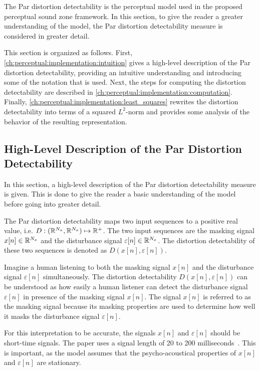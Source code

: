 The Par distortion detectability is the perceptual model used in the proposed perceptual sound zone framework.
In this section, to give the reader a greater understanding of the model, the Par distortion detectability measure is considered in greater detail.

This section is organized as follows.
First, \autoref{ch:perceptual:implementation:intuition} gives a high-level description of the Par distortion detectability, providing an intuitive understanding and introducing some of the notation that is used.
Next, the steps for computing the distortion detectability are described in 
\autoref{ch:perceptual:implementation:computation}.
Finally, \autoref{ch:perceptual:implementation:least_squares} rewrites the distortion detectability into terms of a squared $L^2$-norm and provides some analysis of the behavior of the resulting representation.

\subsection{High-Level Description of the Par Distortion Detectability}
\label{ch:perceptual:implementation:intuition}
In this section, a high-level description of the Par distortion detectability measure is given.
This is done to give the reader a basic understanding of the model before going into greater detail.

The Par distortion detectability maps two input sequences to a positive real value, i.e. $D: (\mathbb{R}^{N_x}, \mathbb{R}^{N_x})\mapsto \mathbb{R}^{+}$.
The two input sequences are the masking signal $x[n]\in\mathbb{R}^{N_x}$ and the disturbance signal $\varepsilon[n]\in\mathbb{R}^{N_x}$.
The distortion detectability of these two sequences is denoted as $D(x[n], \varepsilon[n])$. 

Imagine a human listening to both the masking signal $x[n]$ and the disturbance signal $\varepsilon[n]$ simultaneously.
The distortion detectability $D(x[n], \varepsilon[n])$ can be understood as how easily a human listener can detect the disturbance signal $\varepsilon[n]$ in presence of the masking signal $x[n]$.
The signal $x[n]$ is referred to as the masking signal because its masking properties are used to determine how well it masks the disturbance signal $\varepsilon[n]$.

For this interpretation to be accurate, the signals $x[n]$ and $\varepsilon[n]$ should be short-time signals.
The paper uses a signal length of 20 to 200 milliseconds~\cite{van2005perceptual}.    
This is important, as the model assumes that the psycho-acoustical properties of $x[n]$ and $\varepsilon[n]$ are stationary.  

